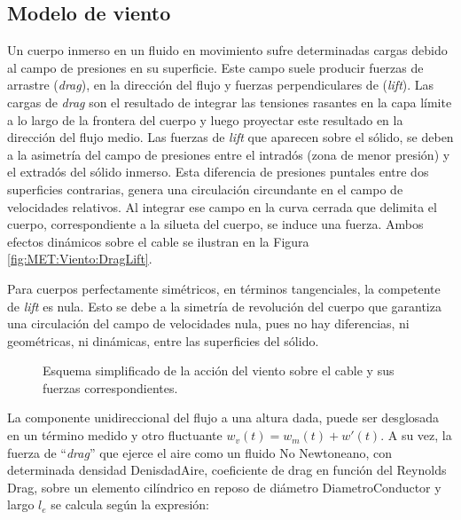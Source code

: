 \subsection{Modelo de viento}\label{Sec:PRE:Modeloviento}
Un cuerpo inmerso en un fluido en movimiento sufre determinadas cargas debido al campo de presiones en su superficie. Este campo suele producir fuerzas de arrastre (\textit{drag}), en la dirección del flujo y fuerzas perpendiculares de (\textit{lift}). Las cargas de \textit{drag} son el resultado de integrar las tensiones rasantes en la capa límite a lo largo de la frontera del cuerpo y luego proyectar este resultado en la dirección del flujo medio. Las fuerzas de \textit{lift} que aparecen sobre el sólido, se deben a la asimetría del campo de presiones entre el intradós (zona de menor presión) y el extradós del sólido inmerso. Esta diferencia de presiones puntales entre dos superficies contrarias, genera una circulación circundante en el campo de velocidades relativos. Al integrar ese campo en la curva cerrada que delimita el cuerpo, correspondiente a la silueta del cuerpo, se induce una fuerza. Ambos efectos dinámicos sobre el cable se ilustran en la Figura \ref{fig:MET:Viento:DragLift}. 

Para cuerpos perfectamente simétricos, en términos tangenciales, la competente de \textit{lift} es nula.  Esto se debe a la simetría de revolución del cuerpo que garantiza una circulación del campo de velocidades nula, pues no hay diferencias, ni geométricas, ni dinámicas, entre las superficies del sólido. 

\begingroup
\begin{figure}[htbp]
	\centering
	\caption{Esquema simplificado de la acción del viento sobre el cable y sus fuerzas correspondientes.} 	\label{fig:Met:Viento:Esquemas}
\end{figure}
\endgroup

La componente unidireccional del flujo a una altura dada, puede ser desglosada en un término medido y otro fluctuante $w_v(t)=w_m(t)+{w}'(t)$. A su vez, la fuerza de ``\textit{drag}'' que ejerce el aire como un fluido No Newtoneano, con determinada densidad \gls{DenisdadAire}, coeficiente de drag en función del Reynolds \gls{Drag}, sobre un elemento cilíndrico en reposo de diámetro \gls{DiametroConductor} y largo $l_e$ se calcula según la expresión:

